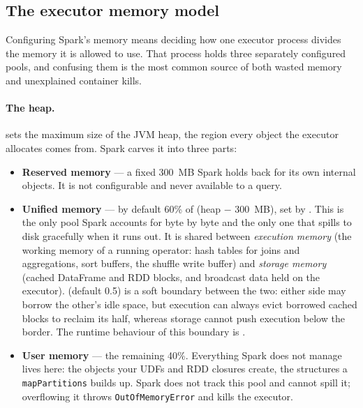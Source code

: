 \subsection{The executor memory model}
\label{sec:prereq-memory-model}

Configuring Spark's memory means deciding how one executor process divides the
memory it is allowed to use. That process holds three separately configured
pools, and confusing them is the most common source of both wasted memory and
unexplained container kills.

\paragraph{The heap.}  sets the maximum size of the
JVM heap, the region every object the executor allocates comes from. Spark carves
it into three parts:

\begin{itemize}
  \item \textbf{Reserved memory} --- a fixed 300~MB Spark holds back for its own
        internal objects. It is not configurable and never available to a query.
  \item \textbf{Unified memory} --- by default 60\% of (heap $-$ 300~MB), set by
        . This is the only pool Spark accounts for
        byte by byte and the only one that spills to disk gracefully when it runs
        out. It is shared between \emph{execution memory} (the working memory of a
        running operator: hash tables for joins and aggregations, sort buffers,
        the shuffle write buffer) and \emph{storage memory} (cached DataFrame and
        RDD blocks, and broadcast data held on the executor).
         (default 0.5) is a soft boundary
        between the two: either side may borrow the other's idle space, but
        execution can always evict borrowed cached blocks to reclaim its half,
        whereas storage cannot push execution below the border. The runtime
        behaviour of this boundary is .
  \item \textbf{User memory} --- the remaining 40\%. Everything Spark does not
        manage lives here: the objects your UDFs and RDD closures create, the
        structures a \texttt{mapPartitions} builds up. Spark does not track this
        pool and cannot spill it; overflowing it throws
        \texttt{OutOfMemoryError} and kills the executor.
\end{itemize}

